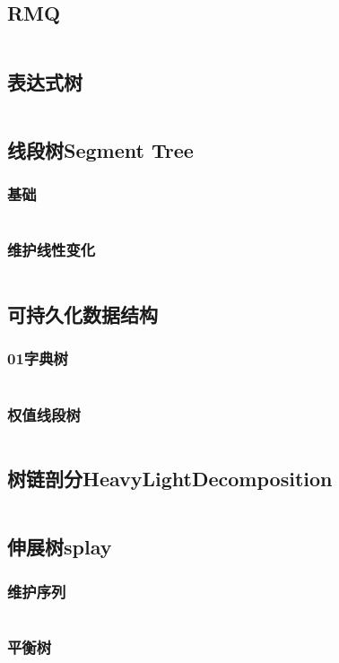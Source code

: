 \documentclass[twoside,sub3section,UTF8]{ctexart}						%
\begin{document}
	\subsection{RMQ}
		\inputminted{c++}{"Data Structure/RMQ.cpp"}
	\subsection{表达式树}
		\inputminted{c++}{"Data Structure/ExpressionTree.cpp"}
	\subsection{线段树Segment Tree}
		\subsubsection{基础}
			\inputminted{c++}{"Data Structure/segmentTree/segmentTree.cpp"}
		\subsubsection{维护线性变化}
			\inputminted{c++}{"Data Structure/segmentTree/pushdown.cpp"}
	\subsection{可持久化数据结构}
		\subsubsection{01字典树}
			\inputminted{c++}{"Data Structure/Presistence/01Dictionary.cpp"}
		\subsubsection{权值线段树}
			\inputminted{c++}{"Data Structure/Presistence/HJT.cpp"}
	\subsection{树链剖分HeavyLightDecomposition}
		\inputminted{c++}{"Data Structure/HeavyLightDecomposition.cpp"}
	\subsection{伸展树splay}
		\subsubsection{维护序列}
			\inputminted{c++}{"Data Structure/splay.cpp"}
		\subsubsection{平衡树}
\end{document}
